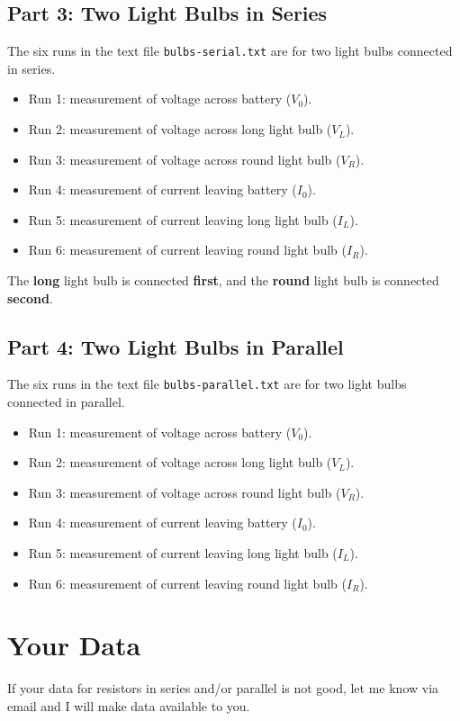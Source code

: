 \subsection{Part 3: Two Light Bulbs in Series}
The six runs in the text file \texttt{bulbs-serial.txt} are for two light bulbs connected in series.
\begin{itemize}
	\item Run 1: measurement of voltage across battery ($V_{0}$).
	\item Run 2: measurement of voltage across long light bulb ($V_{L}$).
	\item Run 3: measurement of voltage across round light bulb ($V_{R}$).
	\item Run 4: measurement of current leaving battery ($I_{0}$).
	\item Run 5: measurement of current leaving long light bulb ($I_{L}$).
	\item Run 6: measurement of current leaving round light bulb ($I_{R}$).
\end{itemize}
The \textbf{long} light bulb is connected \textbf{first}, and the \textbf{round} light bulb is connected \textbf{second}.
\subsection{Part 4: Two Light Bulbs in Parallel}
The six runs in the text file \texttt{bulbs-parallel.txt} are for two light bulbs connected in parallel.
\begin{itemize}
	\item Run 1: measurement of voltage across battery ($V_{0}$).
	\item Run 2: measurement of voltage across long light bulb ($V_{L}$).
	\item Run 3: measurement of voltage across round light bulb ($V_{R}$).
	\item Run 4: measurement of current leaving battery ($I_{0}$).
	\item Run 5: measurement of current leaving long light bulb ($I_{L}$).
	\item Run 6: measurement of current leaving round light bulb ($I_{R}$).
\end{itemize}
\section{Your Data}
If your data for resistors in series and/or parallel is not good, let me know via email and I will make data available to you.
\newpage

